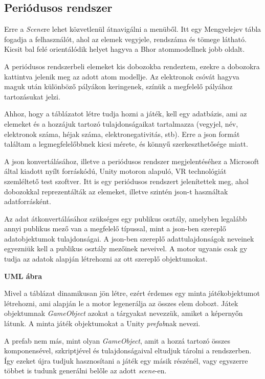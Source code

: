 \documentclass[colorlinks]{thesis-ekf}
\theoremstyle{definition}
\theoremstyle{remark}
\begin{document}
\subsection{Periódusos rendszer}
Erre a \textit{Scene}re lehet közvetlenül átnavigálni a menüből. Itt egy Mengyelejev tábla fogadja a felhasználót, ahol az elemek vegyjele, rendszáma és tömege látható. Kicsit bal felé orientálódik helyet hagyva a Bhor atommodellnek jobb oldalt.

A periódusos rendszerbeli elemeket kis dobozokba rendeztem, ezekre a dobozokra kattintva jelenik meg az adott atom modellje. Az elektronok csóvát hagyva maguk után különböző pályákon keringenek, színük a megfelelő pályához tartozásukat jelzi.

Ahhoz, hogy a táblázatot létre tudja hozni a játék, kell egy adatbázis, ami az elemeket és a hozzájuk tartozó tulajdonságaikat tartalmazza (vegyjel, név, elektronok száma, héjak száma, elektronegativitás, stb). Erre a json formát találtam a legmegfelelőbbnek kicsi mérete, és könnyű szerkeszthetősége miatt. 

A json konvertálásához, illetve a periódusos rendszer megjelentéséhez a Microsoft által kiadott nyílt forráskódú, Unity motoron alapuló, VR technológiát szemléltető test szoftver. Itt is egy periódusos rendszert jelenítettek meg, ahol dobozokkal reprezentálták az elemeket, illetve szintén json-t használtak adatforrásként. \cite{windos_peritabla}

Az adat átkonvertálásához szükséges egy publikus osztály, amelyben legalább annyi publikus mező van a megfelelő típussal, mint a json-ben szereplő adatobjektumok tulajdonságai. A json-ben szereplő adattulajdonságok neveinek egyezniük kell a publikus osztály mezőinek neveivel. A motor ugyanis csak gy tudja az adatok alapján létrehozni az ott szereplő objektumokat.

\textbf{UML ábra }

Mivel a táblázat dinamikusan jön létre, ezért érdemes egy minta játékobjektumot létrehozni, ami alapján le a motor legenerálja az összes elem dobozt. Játek objektumnak \textit{GameObject} azokat a tárgyakat nevezzük, amiket a képernyőn látunk. A minta játék objektumokat a Unity \textit{prefab}nak nevezi.

A prefab nem más, mint olyan \textit{GameObject}, amit a hozzá tartozó összes komponensével, szkriptjével és tulajdonságaival eltudjuk tárolni a rendszerben.\cite{unity_prefab} Így ezeket újra tudjuk hasznosítani a játék egy másik részénél, vagy egyszerre többet is tudunk generálni belőle az adott \textit{scene}-en.
\end{document}
